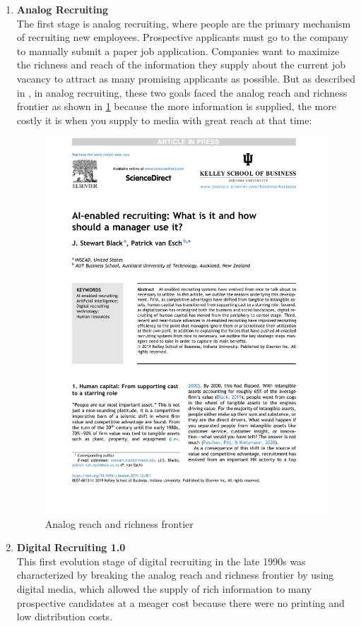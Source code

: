 \documentclass[draft,final]{thesisclass} %
\begin{document}
\begin{enumerate}
    \item \textbf{Analog Recruiting} \label{analog_recruiting}\\
    The first stage is analog recruiting, where people are the primary mechanism of recruiting new employees.
    Prospective applicants must go to the company to manually submit a paper job application.
    Companies want to maximize the richness and reach of the information they supply about the current job vacancy to attract as many promising applicants as possible.
    But as described in \textcite[2]{ai_recruiting}, in analog recruiting, these two goals faced the analog reach and richness frontier as shown in \ref{fig:analog_reach_richness_frontier} because the more information is supplied, the more costly it is when you supply to media with great reach at that time:
    \begin{figure}[H]
        \centering
        \includegraphics[scale=0.5,page=2,width=0.6\linewidth,trim={300 100 55 515},clip]{literature/ai_recruiting.pdf}
        \caption{Analog reach and richness frontier \parencite[2]{ai_recruiting}}
        \label{fig:analog_reach_richness_frontier}
    \end{figure}
    \item \textbf{Digital Recruiting 1.0} \label{digital_recruiting_1}\\
    This first evolution stage of digital recruiting in the late 1990s was characterized by breaking the analog reach and richness frontier by using digital media, which allowed the supply of rich information to many prospective candidates at a meager cost because there were no printing and low distribution costs.

\end{enumerate}
\end{document}

